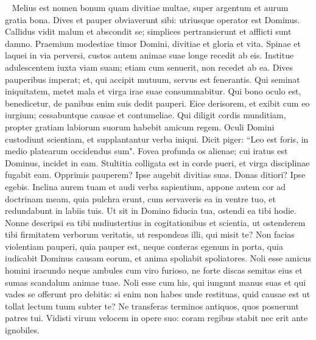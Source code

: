 \begin{biblechapter}   
\verse Melius est nomen bonum quam divitiae multae, super argentum et aurum gratia bona. 
\verse Dives et pauper obviaverunt sibi: utriusque operator est Dominus. 
\verse Callidus vidit malum et abscondit se; simplices pertransierunt et afflicti sunt damno. 
\verse Praemium modestiae timor Domini, divitiae et gloria et vita. 
\verse Spinae et laquei in via perversi, custos autem animae suae longe recedit ab eis. 
\verse Institue adulescentem iuxta viam suam; etiam cum senuerit, non recedet ab ea. 
\verse Dives pauperibus imperat; et, qui accipit mutuum, servus est fenerantis. 
\verse Qui seminat iniquitatem, metet mala et virga irae suae consummabitur. 
\verse Qui bono oculo est, benedicetur, de panibus enim suis dedit pauperi. 
\verse Eice derisorem, et exibit cum eo iurgium; cessabuntque causae et contumeliae. 
\verse Qui diligit cordis munditiam, propter gratiam labiorum suorum habebit amicum regem. 
\verse Oculi Domini custodiunt scientiam, et supplantantur verba iniqui. 
\verse Dicit piger: “Leo est foris, in medio platearum occidendus sum". 
\verse Fovea profunda os alienae; cui iratus est Dominus, incidet in eam. 
\verse Stultitia colligata est in corde pueri, et virga disciplinae fugabit eam. 
\verse Opprimis pauperem? Ipse augebit divitias suas. Donas ditiori? Ipse egebis. 
\verse Inclina aurem tuam et audi verba sapientium, appone autem cor ad doctrinam meam, 
\verse quia pulchra erunt, cum servaveris ea in ventre tuo, et redundabunt in labiis tuis. 
\verse Ut sit in Domino fiducia tua, ostendi ea tibi hodie. 
\verse Nonne descripsi ea tibi nudiustertius in cogitationibus et scientia, 
\verse ut ostenderem tibi firmitatem verborum veritatis, ut respondeas illi, qui misit te? 
\verse Non facias violentiam pauperi, quia pauper est, neque conteras egenum in porta, 
\verse quia iudicabit Dominus causam eorum, et anima spoliabit spoliatores. 
\verse Noli esse amicus homini iracundo neque ambules cum viro furioso, 
\verse ne forte discas semitas eius et sumas scandalum animae tuae. 
\verse Noli esse cum his, qui iungunt manus suas et qui vades se offerunt pro debitis: 
\verse si enim non habes unde restituas, quid causae est ut tollat lectum tuum subter te? 
\verse Ne transferas terminos antiquos, quos posuerunt patres tui. 
\verse Vidisti virum velocem in opere suo: coram regibus stabit nec erit ante ignobiles. 
\end{biblechapter}

